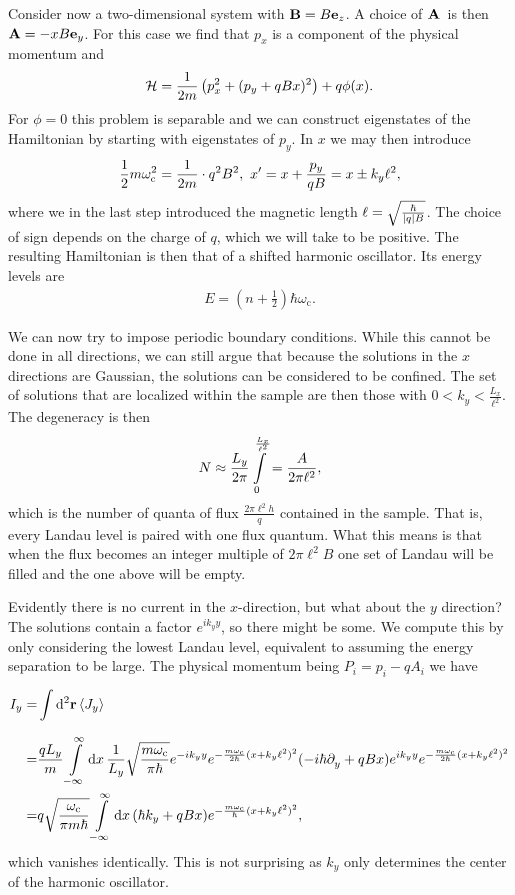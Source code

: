 Consider now a two-dimensional system with $\vb{B} = B\vb{e}_{z}$. A choice of $\vb{A}$ is then $\vb{A} = -xB\vb{e}_{y}$. For this case we find that $p_{x}$ is a component of the physical momentum and
\begin{align*}
	\mathcal{H} = \frac{1}{2m}\left(p_{x}^{2} + (p_{y} + qBx)^{2}\right) + q\phi(x).
\end{align*}
For $\phi = 0$ this problem is separable and we can construct eigenstates of the Hamiltonian by starting with eigenstates of $p_{y}$. In $x$ we may then introduce
\begin{align*}
	\frac{1}{2}m\omega_{\text{c}}^{2} = \frac{1}{2m}\cdot q^{2}B^{2},\ x\p = x + \frac{p_{y}}{qB} = x \pm k_{y}\ell^{2},
\end{align*}
where we in the last step introduced the magnetic length $\ell = \sqrt{\frac{\hbar}{\abs{q}B}}$. The choice of sign depends on the charge of $q$, which we will take to be positive. The resulting Hamiltonian is then that of a shifted harmonic oscillator. Its energy levels are
\begin{align*}
	E = \left(n + \frac{1}{2}\right)\hbar\omega_{\text{c}}.
\end{align*}

We can now try to impose periodic boundary conditions. While this cannot be done in all directions, we can still argue that because the solutions in the $x$ directions are Gaussian, the solutions can be considered to be confined. The set of solutions that are localized within the sample are then those with $0 < k_{y} < \frac{L_{x}}{\ell^{2}}$. The degeneracy is then
\begin{align*}
	N \approx \frac{L_{y}}{2\pi}\int\limits_{0}^{\frac{L_{x}}{\ell^{2}}} = \frac{A}{2\pi\ell^{2}},
\end{align*}
which is the number of quanta of flux $\frac{2\pi\ell^{2}h}{q}$ contained in the sample. That is, every Landau level is paired with one flux quantum. What this means is that when the flux becomes an integer multiple of $2\pi\ell^{2}B$ one set of Landau will be filled and the one above will be empty.

Evidently there is no current in the $x$-direction, but what about the $y$ direction? The solutions contain a factor $e^{ik_{y}y}$, so there might be some. We compute this by only considering the lowest Landau level, equivalent to assuming the energy separation to be large. The physical momentum being $P_{i} = p_{i} - qA_{i}$ we have
\begin{align*}
	I_{y} =& \int\limits_{}^{}\dd[2]{\vb{r}}\expval{J_{y}} \\
	      =& \frac{qL_{y}}{m}\int\limits_{-\infty}^{\infty}\dd{x}\frac{1}{L_{y}}\sqrt{\frac{m\omega_{\text{c}}}{\pi\hbar}}e^{-ik_{y}y}e^{-\frac{m\omega_{\text{c}}}{2\hbar}(x + k_{y}\ell^{2})^{2}}(-i\hbar\partial^{}_{y} + qBx)e^{ik_{y}y}e^{-\frac{m\omega_{\text{c}}}{2\hbar}(x + k_{y}\ell^{2})^{2}} \\
	      =& q\sqrt{\frac{\omega_{\text{c}}}{\pi m\hbar}}\int\limits_{-\infty}^{\infty}\dd{x}(\hbar k_{y} + qBx)e^{-\frac{m\omega_{\text{c}}}{\hbar}(x + k_{y}\ell^{2})^{2}},
\end{align*}
which vanishes identically. This is not surprising as $k_{y}$ only determines the center of the harmonic oscillator.


